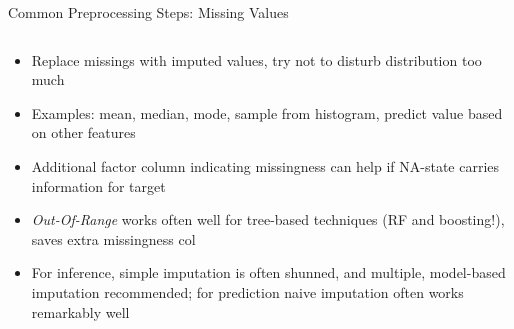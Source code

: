 \begin{frame}{Common Preprocessing Steps: Missing Values}
  \begin{columns}
    \begin{column}{0.7\textwidth}
      \begin{itemize}
        \item Replace missings with imputed values, try not to 
            disturb distribution too much
        \item Examples: mean, median, mode, sample from histogram,
            predict value based on other features
        \item Additional factor column indicating missingness can help
            if NA-state carries information for target
        \item \emph{Out-Of-Range} works often well for tree-based techniques
            (RF and boosting!), saves extra missingness col
        \item For inference, simple imputation is often shunned, 
            and multiple, model-based imputation recommended; 
            for prediction naive imputation often works remarkably well


\end{itemize}
\end{column}
\end{columns}
\end{frame}
